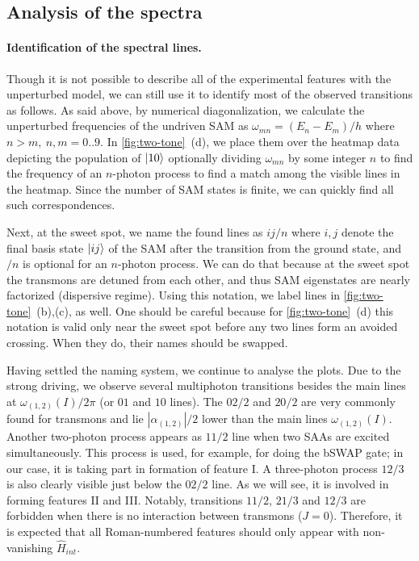 \documentclass[%
 pra,
 amsmath,amssymb,
 reprint,%
]{revtex4-1}
\begin{document}
\subsection{Analysis of the spectra} 
\label{sec:analysis}

\paragraph{Identification of the spectral lines.} 
Though it is not possible to describe all of the 
experimental features with the unperturbed model, 
we can still use it to identify most of the 
observed transitions as follows. As said above, 
by numerical diagonalization, we calculate the 
unperturbed frequencies of the undriven SAM as 
$\omega_{mn} = (E_n - E_m)/h$ where $n>m,\  
n,m=0..9$. In \autoref{fig:two-tone}~(d), we 
place them over the heatmap data depicting the 
population of $\ket{10}$ optionally dividing 
$\omega_{mn}$ by some integer $n$ to find the 
frequency of an $n$-photon process to find a 
match among the visible lines in the heatmap. 
Since the number of SAM states is finite, we can 
quickly find all such correspondences. 

Next, at the sweet spot, we name the found lines 
as $ij/n$ where $i,j$ denote the final basis 
state $\ket{ij}$ of the SAM after the transition 
from the ground state, and $/n$ is optional for 
an $n$-photon process. We can do that because at 
the sweet spot the transmons are detuned from 
each other, and thus SAM eigenstates are nearly 
factorized (dispersive regime). Using this 
notation, we label lines in 
\autoref{fig:two-tone}~(b),(c), as well. One 
should be careful because for 
\autoref{fig:two-tone}~(d) this notation is valid 
only near the sweet spot before any two lines 
form an avoided crossing. When they do, their 
names should be swapped.
 
Having settled the naming system, we continue to 
analyse the plots. Due to the strong driving, we 
observe several multiphoton transitions besides 
the main lines at $\omega_{(1,2)}(I)/2\pi$ (or 
$01$ and $10$ lines). The ${02/2}$ and ${20/2}$ 
are very commonly found for transmons and lie 
$|\alpha_{(1,2)}|/2$ lower than the main lines 
$\omega_{(1,2)}(I	)$. Another two-photon process 
appears as $11/2$ line when two SAAs are excited 
simultaneously. This process is used, for 
example, for doing the bSWAP 
gate\cite{poletto2012entanglement}; in our case, 
it is taking part in formation of feature I. A 
three-photon process $12/3$ is also clearly 
visible just below the $02/2$ line. As we will 
see, it is involved in forming features II and 
III. Notably, transitions $11/2$, ${21/3}$ and 
${12/3}$ are forbidden when there is no 
interaction between transmons ($J=0$). Therefore, 
it is expected that all Roman-numbered features 
should only appear with non-vanishing $\hat 
H_{int}$.
\end{document}
